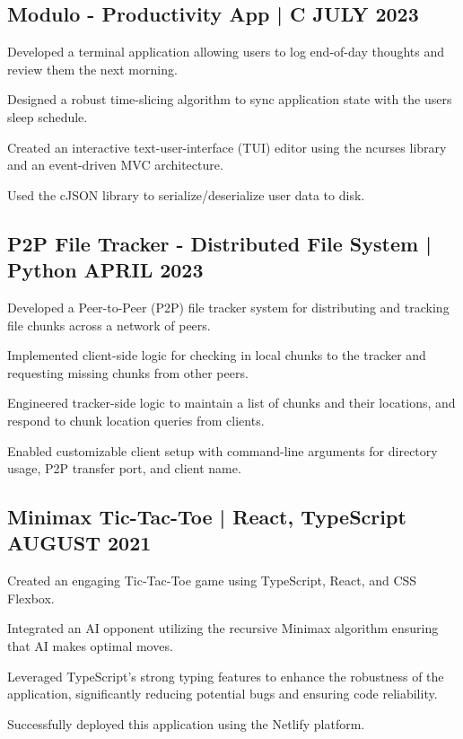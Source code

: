 \documentclass[letter,11pt]{article}
\begin{document}
\subsection{{Modulo - Productivity App | C \hfill JULY 2023}}
\begin{zitemize}
\item Developed a terminal application allowing users to log end-of-day thoughts and review them the next morning.
\item Designed a robust time-slicing algorithm to sync application state with the users sleep schedule.
\item Created an interactive text-user-interface (TUI) editor using the ncurses library and an event-driven MVC architecture.
\item Used the cJSON library to serialize/deserialize user data to disk.
\end{zitemize}

\subsection{{P2P File Tracker - Distributed File System | Python \hfill APRIL 2023}}
\begin{zitemize}
\item Developed a Peer-to-Peer (P2P) file tracker system for distributing and tracking file chunks across a network of peers.
\item Implemented client-side logic for checking in local chunks to the tracker and requesting missing chunks from other peers.
\item Engineered tracker-side logic to maintain a list of chunks and their locations, and respond to chunk location queries from clients.
\item Enabled customizable client setup with command-line arguments for directory usage, P2P transfer port, and client name.
\end{zitemize}

\subsection{{Minimax Tic-Tac-Toe | React, TypeScript \hfill AUGUST 2021}}
\begin{zitemize}
\item Created an engaging Tic-Tac-Toe game using TypeScript, React, and CSS Flexbox.
\item Integrated an AI opponent utilizing the recursive Minimax algorithm ensuring that AI makes optimal moves.
\item Leveraged TypeScript's strong typing features to enhance the robustness of the application, significantly reducing potential bugs and ensuring code reliability.
\item Successfully deployed this application using the Netlify platform.
\end{zitemize}
\end{document}
